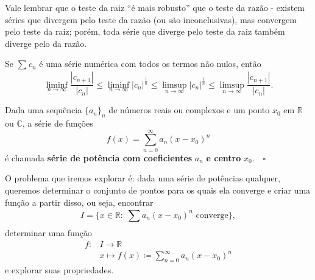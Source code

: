 \documentclass[../analysisII_notes.tex]{subfiles}
\begin{document}
Vale lembrar que o teste da raiz ``é mais robusto'' que o teste da razão - existem séries que divergem pelo teste da razão (ou são inconclusivas), mas convergem pelo teste da raiz; porém, toda série que diverge pelo teste da raiz também diverge pelo da razão.
\begin{theorem*}
	Se \(\sum\limits_{}^{}c_{n}\) é uma série numérica com todos os termos não nulos, então
	\[
		\liminf_{n\to \infty}\frac{|c_{n+1}|}{|c_{n}|}\leq \liminf_{n\to \infty}|c_{n}|^{\frac{1}{n}} \leq \limsup_{n\to \infty}|c_{n}|^{\frac{1}{n}}\leq \limsup_{n\to \infty}\frac{|c_{n+1}|}{|c_{n}|}.
	\]
\end{theorem*}
\begin{def*}
	Dada uma sequência \(\{a_{n}\}_{n}\) de números reais ou complexos e um ponto \(x_{0}\) em \(\mathbb{R}\) ou \(\mathbb{C}\), a série de funções
	\[
		f(x) = \sum\limits_{n=0}^{\infty}a_{n}(x-x_{0})^{n}
	\]
	é chamada \textbf{série de potência com coeficientes }\(a_{n}\) \textbf{e centro }\(x_{0}.\quad \square\)
\end{def*}
O problema que iremos explorar é: dada uma série de potências qualquer, queremos determinar o conjunto de pontos para os quais ela converge e criar uma função a partir disso, ou seja, encontrar
\[
	I = \{x\in \mathbb{R}:\; \sum\limits_{}^{}a_{n}(x-x_{0})^{n}\text{ converge}\},
\]
determinar uma função
\begin{align*}
	f: & I\rightarrow \mathbb{R}                                             \\
	   & x\mapsto f(x)\coloneqq \sum\limits_{n=0}^{\infty}a_{n}(x-x_{0})^{n}
\end{align*}
e explorar suas propriedades.
\end{document}
